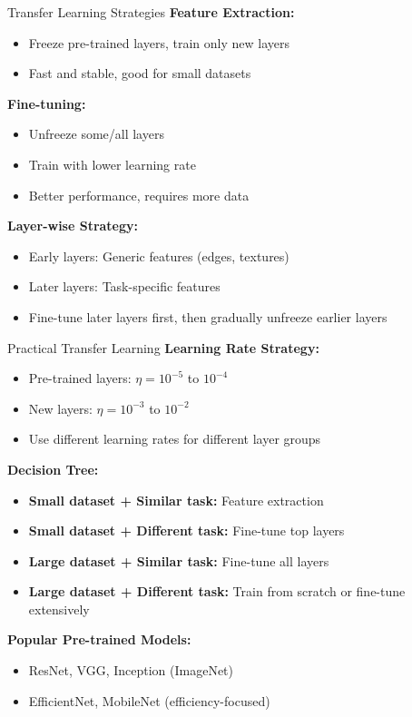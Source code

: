 \documentclass[aspectratio=169,10pt]{beamer}
\begin{document}
\begin{frame}{Transfer Learning Strategies}
\textbf{Feature Extraction:}
\begin{itemize}
\item Freeze pre-trained layers, train only new layers
\item Fast and stable, good for small datasets
\end{itemize}

\textbf{Fine-tuning:}
\begin{itemize}
\item Unfreeze some/all layers
\item Train with lower learning rate
\item Better performance, requires more data
\end{itemize}

\textbf{Layer-wise Strategy:}
\begin{itemize}
\item Early layers: Generic features (edges, textures)
\item Later layers: Task-specific features
\item Fine-tune later layers first, then gradually unfreeze earlier layers
\end{itemize}
\end{frame}

\begin{frame}{Practical Transfer Learning}
\textbf{Learning Rate Strategy:}
\begin{itemize}
\item Pre-trained layers: $\eta = 10^{-5}$ to $10^{-4}$
\item New layers: $\eta = 10^{-3}$ to $10^{-2}$
\item Use different learning rates for different layer groups
\end{itemize}

\textbf{Decision Tree:}
\begin{itemize}
\item \textbf{Small dataset + Similar task:} Feature extraction
\item \textbf{Small dataset + Different task:} Fine-tune top layers
\item \textbf{Large dataset + Similar task:} Fine-tune all layers
\item \textbf{Large dataset + Different task:} Train from scratch or fine-tune extensively
\end{itemize}

\textbf{Popular Pre-trained Models:}
\begin{itemize}
\item ResNet, VGG, Inception (ImageNet)
\item EfficientNet, MobileNet (efficiency-focused)
\end{itemize}
\end{frame}
\end{document}
